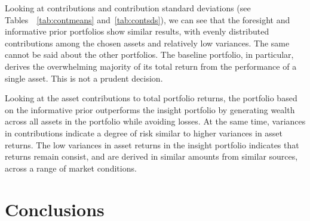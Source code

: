 \documentclass[a4paper]{article}\usepackage[]{graphicx}\usepackage[]{color}
\begin{document}
\begin{table}[ht]
\centering
{}
\caption{Standard deviation of asset contributions to 5,000 simulated portfolio returns for the five portfolios examined in this project. The final three rows refer to portfolios constructed using Bayesian estimates of the parameters.} 
\label{tab:contsds}
\end{table}


Looking at contributions and contribution standard deviations (see Tables~~\ref{tab:contmeans} and~\ref{tab:contsds}), we can see that the foresight and informative prior portfolios show similar results, with evenly distributed contributions among the chosen assets and relatively low variances. The same cannot be said about the other portfolios. The baseline portfolio, in particular, derives the overwhelming majority of its total return from the performance of a single asset. This is not a prudent decision.

Looking at the asset contributions to total portfolio returns, the portfolio based on the informative prior outperforms the insight portfolio by generating wealth across all assets in the portfolio while avoiding losses. At the same time, variances in contributions indicate a degree of risk similar to higher variances in asset returns. The low variances in asset returns in the insight portfolio indicates that returns remain consist, and are derived in similar amounts from similar sources, across a range of market conditions.

\section{Conclusions}
\end{document}

